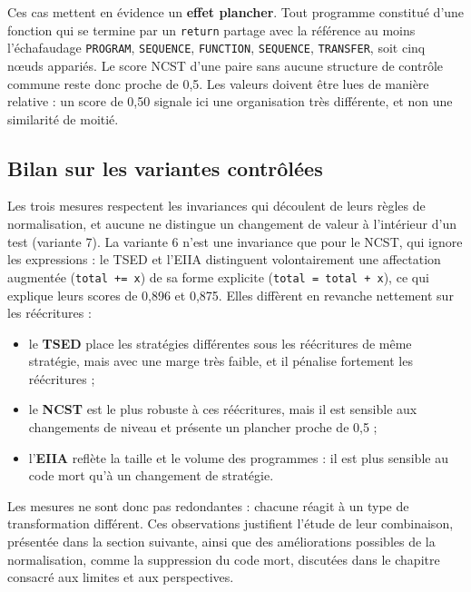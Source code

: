 \documentclass[12pt,a4paper,oneside]{report}
\begin{document}
Ces cas mettent en évidence un \textbf{effet plancher}. Tout programme
constitué d'une fonction qui se termine par un \texttt{return} partage avec
la référence au moins l'échafaudage \texttt{PROGRAM}, \texttt{SEQUENCE},
\texttt{FUNCTION}, \texttt{SEQUENCE}, \texttt{TRANSFER}, soit cinq nœuds
appariés. Le score NCST d'une paire sans aucune structure de contrôle commune
reste donc proche de 0,5. Les valeurs doivent être lues de manière relative :
un score de 0,50 signale ici une organisation très différente, et non une
similarité de moitié.

\subsection{Bilan sur les variantes contrôlées}

Les trois mesures respectent les invariances qui découlent de leurs règles de
normalisation, et aucune ne distingue un changement de valeur à l'intérieur
d'un test (variante 7). La variante 6 n'est une invariance que pour le NCST,
qui ignore les expressions : le TSED et l'EIIA distinguent volontairement une
affectation augmentée (\texttt{total += x}) de sa forme explicite
(\texttt{total = total + x}), ce qui explique leurs scores de 0,896 et
0,875. Elles diffèrent en revanche nettement sur les
réécritures :
\begin{itemize}
  \item le \textcolor{tsedcol}{\textbf{TSED}} place les stratégies
        différentes sous les réécritures de même stratégie, mais avec une
        marge très faible, et il pénalise fortement les réécritures ;
  \item le \textcolor{ncstcol}{\textbf{NCST}} est le plus robuste à ces
        réécritures, mais il est sensible aux changements de niveau et
        présente un plancher proche de 0,5 ;
  \item l'\textcolor{eiiacol}{\textbf{EIIA}} reflète la taille et le volume
        des programmes : il est plus sensible au code mort qu'à un changement
        de stratégie.
\end{itemize}
Les mesures ne sont donc pas redondantes : chacune réagit à un type de
transformation différent. Ces observations justifient l'étude de leur
combinaison, présentée dans la section suivante, ainsi que des améliorations
possibles de la normalisation, comme la suppression du code mort, discutées
dans le chapitre consacré aux limites et aux perspectives.
\end{document}
